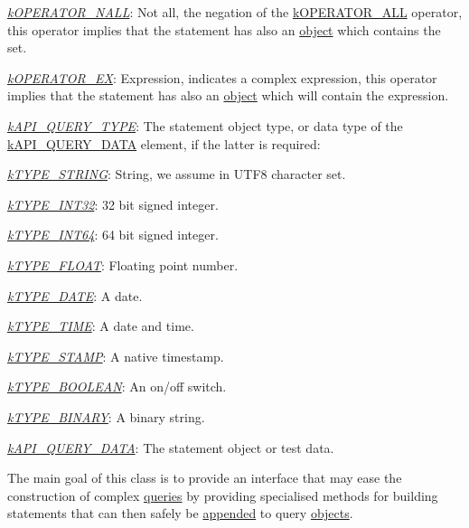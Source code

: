 \begin{DoxyItemize}
\begin{DoxyItemize}
\item {\itshape \hyperlink{}{k\-O\-P\-E\-R\-A\-T\-O\-R\-\_\-\-N\-A\-L\-L}}\-: Not all, the negation of the \hyperlink{}{k\-O\-P\-E\-R\-A\-T\-O\-R\-\_\-\-A\-L\-L} operator, this operator implies that the statement has also an \hyperlink{}{object} which contains the set. 
\item {\itshape \hyperlink{}{k\-O\-P\-E\-R\-A\-T\-O\-R\-\_\-\-E\-X}}\-: Expression, indicates a complex expression, this operator implies that the statement has also an \hyperlink{}{object} which will contain the expression. 
\end{DoxyItemize}
\item {\itshape \hyperlink{}{k\-A\-P\-I\-\_\-\-Q\-U\-E\-R\-Y\-\_\-\-T\-Y\-P\-E}}\-: The statement object type, or data type of the \hyperlink{}{k\-A\-P\-I\-\_\-\-Q\-U\-E\-R\-Y\-\_\-\-D\-A\-T\-A} element, if the latter is required\-: 
\begin{DoxyItemize}
\item {\itshape \hyperlink{}{k\-T\-Y\-P\-E\-\_\-\-S\-T\-R\-I\-N\-G}}\-: String, we assume in U\-T\-F8 character set. 
\item {\itshape \hyperlink{}{k\-T\-Y\-P\-E\-\_\-\-I\-N\-T32}}\-: 32 bit signed integer. 
\item {\itshape \hyperlink{}{k\-T\-Y\-P\-E\-\_\-\-I\-N\-T64}}\-: 64 bit signed integer. 
\item {\itshape \hyperlink{}{k\-T\-Y\-P\-E\-\_\-\-F\-L\-O\-A\-T}}\-: Floating point number. 
\item {\itshape \hyperlink{}{k\-T\-Y\-P\-E\-\_\-\-D\-A\-T\-E}}\-: A date. 
\item {\itshape \hyperlink{}{k\-T\-Y\-P\-E\-\_\-\-T\-I\-M\-E}}\-: A date and time. 
\item {\itshape \hyperlink{}{k\-T\-Y\-P\-E\-\_\-\-S\-T\-A\-M\-P}}\-: A native timestamp. 
\item {\itshape \hyperlink{}{k\-T\-Y\-P\-E\-\_\-\-B\-O\-O\-L\-E\-A\-N}}\-: An on/off switch. 
\item {\itshape \hyperlink{}{k\-T\-Y\-P\-E\-\_\-\-B\-I\-N\-A\-R\-Y}}\-: A binary string. 
\end{DoxyItemize}
\item {\itshape \hyperlink{}{k\-A\-P\-I\-\_\-\-Q\-U\-E\-R\-Y\-\_\-\-D\-A\-T\-A}}\-: The statement object or test data. 
\end{DoxyItemize}

The main goal of this class is to provide an interface that may ease the construction of complex \hyperlink{class_c_query}{queries} by providing specialised methods for building statements that can then safely be \hyperlink{class_c_query_a6cd7ba8e153fc299ba87b614ccb56486}{appended} to query \hyperlink{class_c_query}{objects}.

